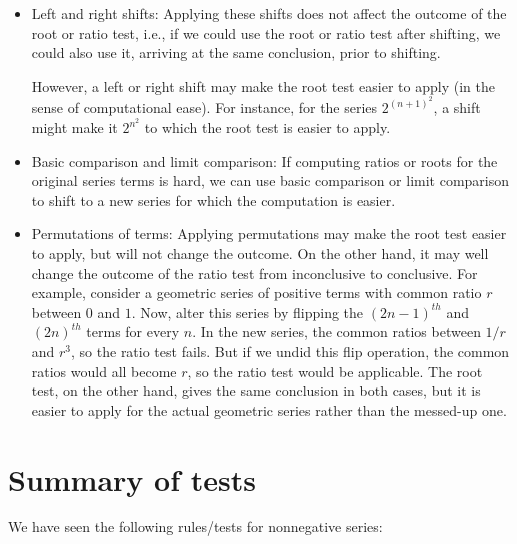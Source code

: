 \documentclass[10pt]{amsart}
\begin{document}
\begin{itemize}
\item Left and right shifts: Applying these shifts does not affect the
  outcome of the root or ratio test, i.e., if we could use the root or
  ratio test after shifting, we could also use it, arriving at the
  same conclusion, prior to shifting.

  However, a left or right shift may make the root test easier to
  apply (in the sense of computational ease). For instance, for the
  series $2^{(n + 1)^2}$, a shift might make it $2^{n^2}$ to which the
  root test is easier to apply.
\item Basic comparison and limit comparison: If computing ratios or
  roots for the original series terms is hard, we can use basic
  comparison or limit comparison to shift to a new series for which
  the computation is easier.
\item Permutations of terms: Applying permutations may make the root
  test easier to apply, but will not change the outcome. On the other
  hand, it may well change the outcome of the ratio test from
  inconclusive to conclusive. For example, consider a geometric series
  of positive terms with common ratio $r$ between $0$ and $1$. Now,
  alter this series by flipping the $(2n - 1)^{th}$ and $(2n)^{th}$
  terms for every $n$. In the new series, the common ratios between
  $1/r$ and $r^3$, so the ratio test fails. But if we undid this flip
  operation, the common ratios would all become $r$, so the ratio test
  would be applicable. The root test, on the other hand, gives the
  same conclusion in both cases, but it is easier to apply for the
  actual geometric series rather than the messed-up one.
\end{itemize}

\section{Summary of tests}

We have seen the following rules/tests for nonnegative series:
\end{document}

